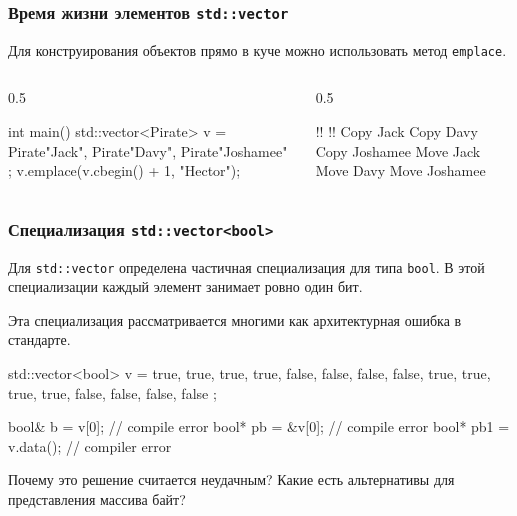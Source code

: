 \documentclass[compress, 8pt, aspectratio=169]{beamer}
\begin{document}
  \begin{frame}[fragile]

    \frametitle{Время жизни элементов \texttt{std::vector}}

    Для конструирования объектов прямо в куче можно использовать
    метод \texttt{emplace}.

    \begin{columns}[T]

      \begin{column}{0.5\textwidth}

        \begin{mycppinplacelisting}
int main() {
    std::vector<Pirate> v = {
        Pirate{"Jack"},
        Pirate{"Davy"},
        Pirate{"Joshamee"}
    };
    v.emplace(v.cbegin() + 1,
         "Hector");
}
        \end{mycppinplacelisting}

      \end{column}

      \begin{column}{0.5\textwidth}

        \begin{terminalwindow}
!!
!!
Copy Jack
Copy Davy
Copy Joshamee
Move Jack
Move Davy
Move Joshamee
        \end{terminalwindow}

      \end{column}

    \end{columns}

  \end{frame}

  \begin{frame}[fragile]

    \frametitle{Специализация \texttt{std::vector<bool>}}

    Для \texttt{std::vector} определена частичная специализация
    для типа \texttt{bool}.
    В этой специализации каждый элемент занимает ровно один бит.

    \hfill \break
    Эта специализация рассматривается многими как архитектурная ошибка
    в стандарте.

    \begin{mycppinplacelisting}
std::vector<bool> v = {
    true, true, true, true,
    false, false, false, false,
    true, true, true, true,
    false, false, false, false
};

bool& b = v[0]; // compile error
bool* pb = &v[0]; // compile error
bool* pb1 = v.data(); // compiler error
    \end{mycppinplacelisting}

    \begin{task}
      Почему это решение считается неудачным?
      Какие есть альтернативы для представления массива
      байт?
    \end{task}

  \end{frame}
\end{document}
